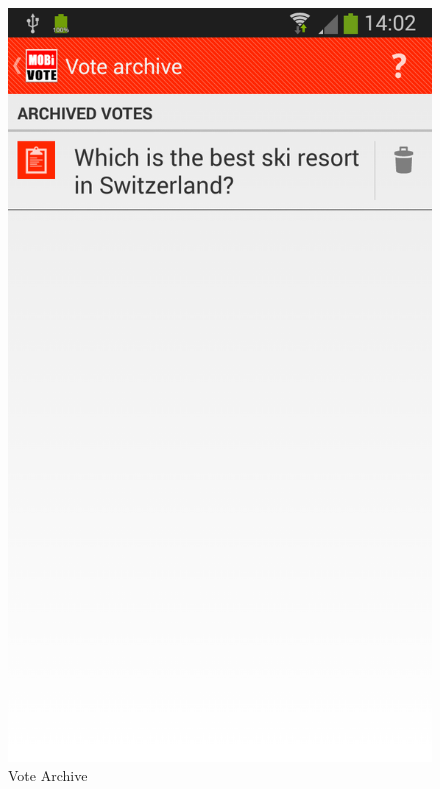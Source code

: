 \documentclass[numbers=noenddot, abstract=on, a4paper, headsepline,
footsepline, oneside, draft=off]{scrreprt}
\begin{document}
\begin{figure}[!htb]
	\centering
	\includegraphics[height=.4\textheight]{img/screenshots/vote_archive}
	\caption{Vote Archive}
	\label{fig:handbook_votearchive}
\end{figure}

\listoftodos
\end{document}
